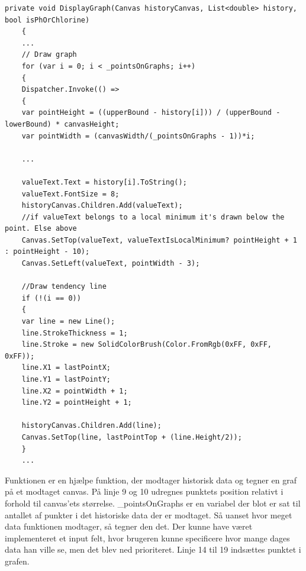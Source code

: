\begin{lstlisting}[caption=DisplayGraph, label=DisplayGraph]
	private void DisplayGraph(Canvas historyCanvas, List<double> history, bool isPhOrChlorine)
	{
	...
	// Draw graph
	for (var i = 0; i < _pointsOnGraphs; i++)
	{
	Dispatcher.Invoke(() =>
	{
	var pointHeight = ((upperBound - history[i])) / (upperBound - lowerBound) * canvasHeight;
	var pointWidth = (canvasWidth/(_pointsOnGraphs - 1))*i;
	
	...
	
	valueText.Text = history[i].ToString();
	valueText.FontSize = 8;
	historyCanvas.Children.Add(valueText);
	//if valueText belongs to a local minimum it's drawn below the point. Else above
	Canvas.SetTop(valueText, valueTextIsLocalMinimum? pointHeight + 1 : pointHeight - 10);
	Canvas.SetLeft(valueText, pointWidth - 3);
	
	//Draw tendency line
	if (!(i == 0))
	{
	var line = new Line();
	line.StrokeThickness = 1;
	line.Stroke = new SolidColorBrush(Color.FromRgb(0xFF, 0xFF, 0xFF));
	line.X1 = lastPointX;
	line.Y1 = lastPointY;
	line.X2 = pointWidth + 1;
	line.Y2 = pointHeight + 1;
	
	historyCanvas.Children.Add(line);
	Canvas.SetTop(line, lastPointTop + (line.Height/2));
	}
	...
\end{lstlisting}
Funktionen er en hjælpe funktion, der modtager historisk data og tegner en graf på et modtaget canvas.
På linje 9 og 10 udregnes punktets position relativt i forhold til canvas'ets størrelse. 
\_pointsOnGraphs er en variabel der blot er sat til antallet af punkter i det historiske data der er modtaget. Så uanset hvor meget data funktionen modtager, så tegner den det. Der kunne have været implementeret et input felt, hvor brugeren kunne specificere hvor mange dages data han ville se, men det blev ned prioriteret. 
Linje 14 til 19 indsættes punktet i grafen.

